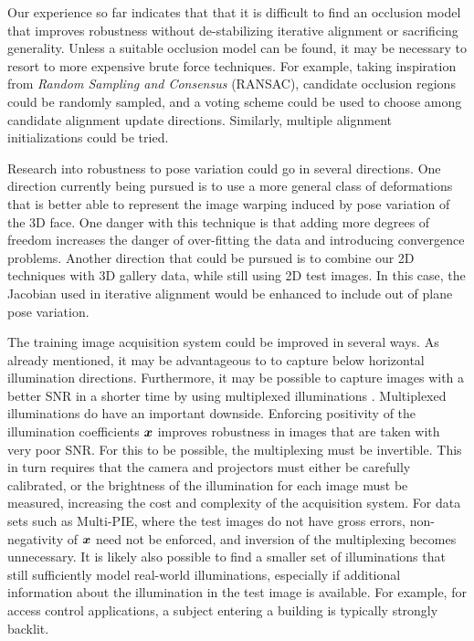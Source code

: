 Our experience so far indicates that that it is difficult to find an occlusion
model that improves robustness without de-stabilizing iterative alignment or
sacrificing generality.  Unless a suitable occlusion model can be found, it may
be necessary to resort to more expensive brute force techniques. For example,
taking inspiration from {\em Random Sampling and Consensus} (RANSAC), candidate
occlusion regions could be randomly sampled, and a voting scheme could be used
to choose among candidate alignment update directions.  Similarly, multiple
alignment initializations could be tried. 

Research into robustness to pose variation could go in several directions.  One
direction currently being pursued is to use a more general class of
deformations that is better able to represent the image warping induced by pose
variation of the 3D face.  One danger with this technique is that adding more
degrees of freedom increases the danger of over-fitting the data and
introducing convergence problems.  Another direction that could be pursued is
to combine our 2D techniques with 3D gallery data, while still using 2D test
images.  In this case, the Jacobian used in iterative alignment would be
enhanced to include out of plane pose variation.

The training image acquisition system could be improved in several ways.  As
already mentioned, it may be advantageous to to capture below horizontal
illumination directions.  Furthermore, it may be possible to capture images
with a better SNR in a shorter time by using multiplexed illuminations
\cite{schechner2007multiplexing}.  Multiplexed illuminations do have an
important downside. Enforcing positivity of the illumination coefficients 
${\boldsymbol{x}}$ improves robustness in images that are taken with very poor SNR.  For this
to be possible, the multiplexing must be invertible.  This in turn requires
that the camera and projectors must either be carefully calibrated, or the
brightness of the illumination for each image must be measured, increasing the
cost and complexity of the acquisition system.  For data sets such as
Multi-PIE, where the test images do not have gross errors, non-negativity of
${\boldsymbol{x}}$ need not be enforced, and inversion of the multiplexing becomes
unnecessary.  It is likely also possible to find a smaller set of illuminations
that still sufficiently model real-world illuminations, especially if
additional
information about the illumination in the test image is available.  For
example, for access control applications, a subject entering a building is
typically strongly backlit.




